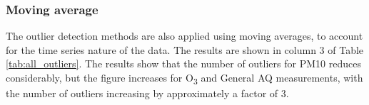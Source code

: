 \documentclass[11pt]{report}
\begin{document}
\subsubsection{Moving average}

The outlier detection methods are also applied using moving averages, to account for the time series nature of the data. The results are shown in column 3 of Table \ref{tab:all_outliers}. The results show that the number of outliers for PM10 reduces considerably, but the figure increases for O\textsubscript{3} and General AQ measurements, with the number of outliers increasing by approximately a factor of 3.

\end{document}
